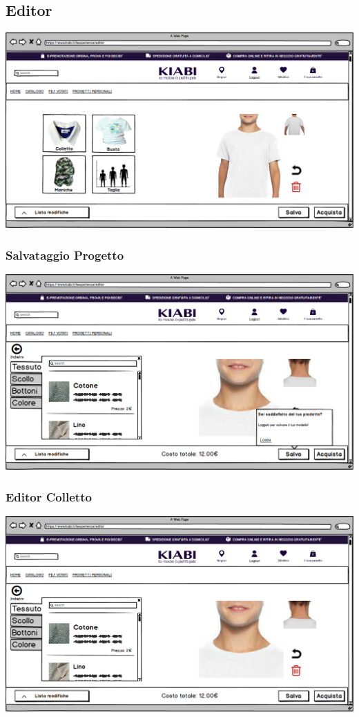 \documentclass[12pt,italian,]{report}
\begin{document}
\subsection{Editor} 
\includegraphics{balsamiq/Editor base.png}


\subsubsection{Salvataggio Progetto} 
\includegraphics{balsamiq/Editor - caratteristica collo tessuto non loggato.png}

\subsubsection{Editor Colletto} 
\includegraphics{balsamiq/Editor - caratteristica collo tessuto.png}
\end{document}
